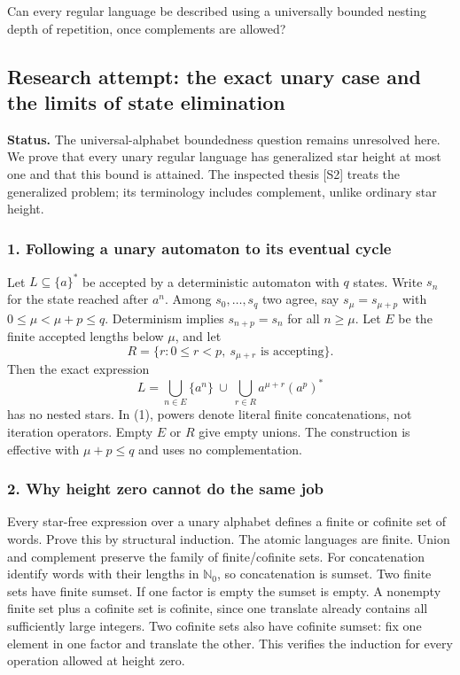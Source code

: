 \documentclass[11pt,a4paper]{article}
\begin{document}
Can every regular language be described using a universally bounded nesting depth of repetition, once complements are allowed?

\subsection{Research attempt: the exact unary case and the limits of state elimination}
\textbf{Status.} The universal-alphabet boundedness question remains unresolved here. We prove that every unary regular language has generalized star height at most one and that this bound is attained. The inspected thesis [S2] treats the generalized problem; its terminology includes complement, unlike ordinary star height.

\subsubsection{1. Following a unary automaton to its eventual cycle}
Let $L\subseteq\{a\}^*$ be accepted by a deterministic automaton with $q$ states. Write $s_n$ for the state reached after $a^n$. Among $s_0,\ldots,s_q$ two agree, say $s_\mu=s_{\mu+p}$ with $0\leq\mu<\mu+p\leq q$. Determinism implies $s_{n+p}=s_n$ for all $n\geq\mu$. Let $E$ be the finite accepted lengths below $\mu$, and let
\[R=\{r:0\leq r<p,\ s_{\mu+r}\text{ is accepting}\}.\]
Then the exact expression
\[L=\bigcup_{n\in E}\{a^n\}\ \cup\
\bigcup_{r\in R} a^{\mu+r}(a^p)^*\tag{1}\]
has no nested stars. In (1), powers denote literal finite concatenations, not iteration operators. Empty $E$ or $R$ give empty unions. The construction is effective with $\mu+p\leq q$ and uses no complementation.

\subsubsection{2. Why height zero cannot do the same job}
Every star-free expression over a unary alphabet defines a finite or cofinite set of words. Prove this by structural induction. The atomic languages are finite. Union and complement preserve the family of finite/cofinite sets. For concatenation identify words with their lengths in $\mathbb N_0$, so concatenation is sumset. Two finite sets have finite sumset. If one factor is empty the sumset is empty. A nonempty finite set plus a cofinite set is cofinite, since one translate already contains all sufficiently large integers. Two cofinite sets also have cofinite sumset: fix one element in one factor and translate the other. This verifies the induction for every operation allowed at height zero.
\end{document}
